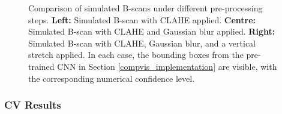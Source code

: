        
        \begin{figure}[htbp]
          \centering
        
          \hfill
          \hfill
        
          \caption[Comparison of simulated B-scans under different pre-processing steps]{Comparison of simulated B-scans under different pre-processing steps. 
          \textbf{Left:} Simulated B-scan with CLAHE applied. 
          \textbf{Centre:} Simulated B-scan with CLAHE and Gaussian blur applied. 
          \textbf{Right:} Simulated B-scan with CLAHE, Gaussian blur, and a vertical stretch applied. 
          In each case, the bounding boxes from the pre-trained CNN in Section \ref{compvis_implementation} are visible, with the corresponding numerical confidence level.}
          \label{fig:sim_bscan_comparison}
        \end{figure}
        
    
    \subsubsection{CV Results}
    
